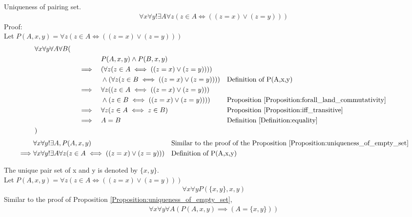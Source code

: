 \begin{prop}
\label{Proposition:uniqueness_of_pairing_set}
Uniqueness of pairing set.
\begin{align*}
\forall x \forall y !\exists A \forall z (z \in A \iff ((z=x) \lor (z=y)))
\end{align*}
Proof: \\
Let $P(A,x,y) =  \forall z (z \in A \iff ((z=x) \lor (z=y)))$
\begin{align*}
& \forall x \forall y \forall A \forall B ( \\
& \quad && &&  P(A,x,y) \land P(B,x,y) \\
& \quad && \implies &&  (\forall z (z \in A \iff ((z=x) \lor (z=y)))) \\
& \quad && && \land      (\forall z (z \in B \iff ((z=x) \lor (z=y))))
&& \text{Definition of P(A,x,y)} \\
& \quad && \implies &&  \forall z ((z \in A \iff ((z=x) \lor (z=y))) \\
& \quad && && \land                    (z \in B \iff ((z=x) \lor (z=y))))
&& \text{Proposition \ref{Proposition:forall_land_commutativity}} \\
& \quad && \implies && \forall z (z \in A \iff z \in B)
&& \text{Proposition \ref{Proposition:iff_transitive}} \\
& \quad && \implies && A = B
&& \text{Definition \ref{Definition:equality}} \\
& )
\end{align*}
\begin{align*}
& \forall x \forall y !\exists A, P(A,x,y)
&& \text{Similar to the proof of the Proposition \ref{Proposition:uniqueness_of_empty_set}} \\
\implies & \forall x \forall y !\exists A \forall z (z \in A \iff ((z=x) \lor (z=y))) && \text{Definition of P(A,x,y)} \\
\end{align*}
\end{prop}

\begin{defn}
\label{Definition:pair_set}
The unique pair set of x and y is denoted by $\{ x,y \}$. \\
Let $P(A,x,y) =  \forall z (z \in A \iff ((z=x) \lor (z=y)))$ \\
\begin{align*}
\forall x \forall y P(\{ x,y \} ,x,y)
\end{align*}
Similar to the proof of Proposition \ref{Proposition:uniqueness_of_empty_set},
\begin{align*}
\forall x \forall y \forall A (P(A,x,y) \implies (A=\{ x,y \}))
\end{align*}
\end{defn}

